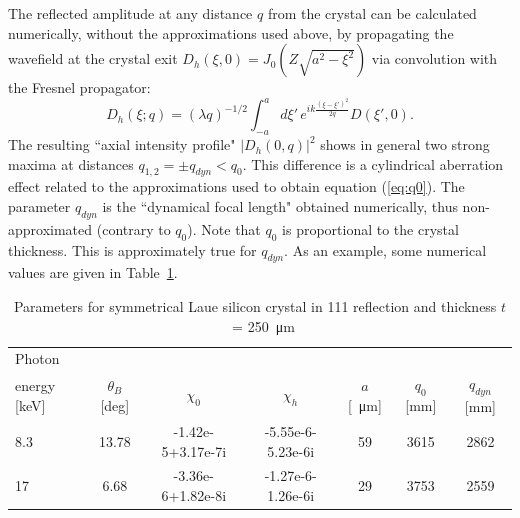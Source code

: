 \documentclass[preprint]{iucr}              %
\newcommand{\inblue}[1]{{\color{black}#1}}
\newcommand{\inred}[1]{{\color{red}#1}}
\begin{document}
The reflected amplitude at any distance $q$ from the crystal can be calculated numerically, without the approximations used above, \inblue{by propagating the wavefield at the crystal exit} $D_h(\xi,0)=J_0(Z\sqrt{a^2-\xi^2})$ via convolution with the Fresnel propagator:
\begin{equation}
\label{eq:Fresnel}
    D_h(\xi; q) = (\lambda q)^{-1/2} \int_{-a}^a d\xi'  \, e^{i k 
    \frac{(\xi-\xi')^2}{2 q}} 
    D(\xi',0).
\end{equation}
The resulting ``axial intensity profile" $|D_h(0,q)|^2$ shows in general two strong maxima at distances $q_{1,2}=\pm q_{dyn} < q_0$. This difference is a cylindrical aberration effect related to the approximations used to obtain equation (\ref{eq:q0}). \inblue{The parameter $q_{dyn}$ is the ``dynamical focal length" obtained numerically, thus non-approximated (contrary to $q_0$)}. Note that $q_0$ is proportional to the crystal thickness. This is \inred{approximately true} for $q_{dyn}$. As an example, some numerical values are given in Table~\ref{table:example}.




\begin{table}
\caption{Parameters for symmetrical Laue silicon crystal in 111 reflection and thickness $t$~= \SI{250}{\micro\meter}}
\begin{tabular}{lcccccc}
 Photon \\energy  [keV]  & $\theta_B$ [deg]       & $\chi_0$ & $\chi_h$ & $a$ [\SI{}{\micro\meter}]& $q_0$ [mm] & $q_{dyn}$  [mm] \\
\hline
 8.3  &  13.78 & -1.42e-5+3.17e-7i & -5.55e-6-5.23e-6i  & 59  & 3615  & 2862   \\
 17   &  6.68 & -3.36e-6+1.82e-8i & -1.27e-6-1.26e-6i  & 29  & 3753  & 2559 
\end{tabular}
\label{table:example}
\end{table}
\end{document}
